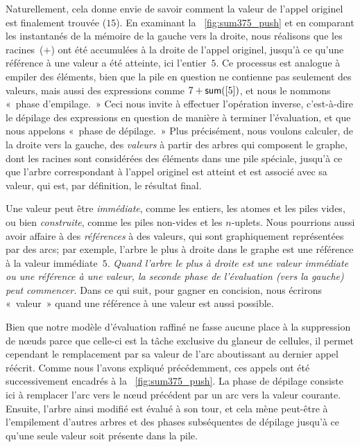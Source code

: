 Naturellement, cela donne envie de savoir comment la valeur de l'appel
originel est finalement trouvée (\(15\)). En examinant la
\fig~\ref{fig:sum375_push} et en comparant les instantanés de la
mémoire de la gauche vers la droite, nous réalisons que les
racines~(\(+\)) ont été accumulées à la droite de l'appel originel,
jusqu'à ce qu'une référence à une valeur a été atteinte, ici
l'entier~\(5\). Ce processus est analogue à empiler des éléments, bien
que la pile en question ne contienne pas seulement des valeurs, mais
aussi des expressions comme \(7 + \textsf{sum}([5])\), et nous le nommons
«~phase d'empilage.~» Ceci nous invite à effectuer l'opération inverse,
c'est-à-dire le dépilage des expressions en question de manière à
terminer l'évaluation, et que nous appelons «~phase de dépilage.~» Plus
précisément, nous voulons calculer, de la droite vers la gauche, des
\emph{valeurs} à partir des arbres qui composent le graphe, dont les
racines sont considérées des éléments dans une pile spéciale, jusqu'à
ce que l'arbre correspondant à l'appel originel est atteint et est
associé avec sa valeur, qui est, par définition, le résultat final.

Une valeur peut être \emph{immédiate}, comme les entiers, les atomes
et les piles vides, ou bien \emph{construite}, comme les piles
non-vides et les \(n\)-uplets. Nous pourrions aussi avoir affaire à
des \emph{références} à des valeurs, qui sont graphiquement
représentées par des arcs; par exemple, l'arbre le plus à droite dans
le graphe est une référence à la valeur immédiate~\(5\). \emph{Quand
  l'arbre le plus à droite est une valeur immédiate ou une référence à
  une valeur, la seconde phase de l'évaluation (vers la gauche) peut
  commencer.} Dans ce qui suit, pour gagner en concision, nous
écrirons «~valeur~» quand une référence à une valeur est aussi possible.

Bien que notre modèle d'évaluation raffiné ne fasse aucune place à la
suppression de nœuds parce que celle-ci est la tâche exclusive du
glaneur de cellules, il permet cependant le remplacement par sa valeur
de l'arc aboutissant au dernier appel réécrit. Comme nous l'avons
expliqué précédemment, ces appels ont été successivement encadrés à la
\fig~\vref{fig:sum375_push}. La phase de dépilage consiste ici à
remplacer l'arc vers le nœud  précédent par un arc vers
la valeur courante. Ensuite, l'arbre ainsi modifié est évalué à son
tour, et cela mène peut-être à l'empilement d'autres arbres et des
phases subséquentes de dépilage jusqu'à ce qu'une seule valeur soit
présente dans la pile.

